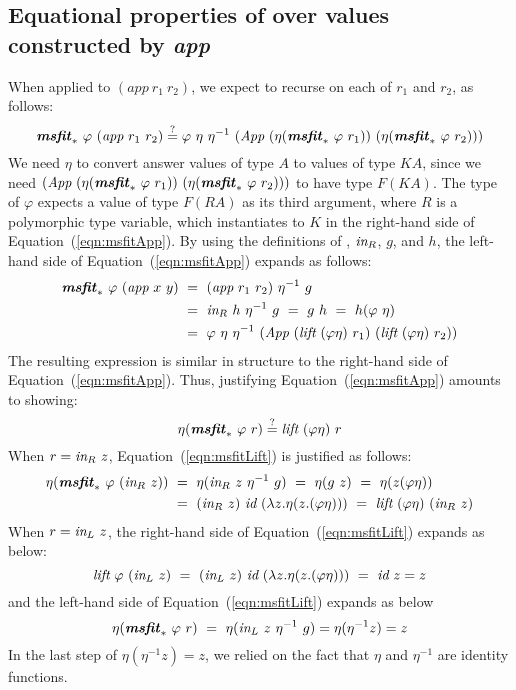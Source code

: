 \subsection{Equational properties of \msfit{*} over
	values constructed by \textit{app}}
	\label{sec:theory:eqapp}
When applied to $(\textit{app}~r_1~r_2)$, we expect \msfit{*} to
recurse on each of $r_1$ and $r_2$, as follows:\vspace*{-1ex}
\begin{equation}
\textbf{\textit{msfit}}_{*}~\varphi~(\textit{app}~r_1~r_2)
\stackrel{?}{=}
\varphi~\eta~\eta^{-1}~(\textit{App}~(\eta(\textbf{\textit{msfit}}_{*}~\varphi~r_1))
					~(\eta(\textbf{\textit{msfit}}_{*}~\varphi~r_2)))
\label{eqn:msfitApp}
\end{equation}
We need $\eta$ to convert answer values of type $A$ to values of type $KA$,
since we need $(\textit{App}~(\eta(\textbf{\textit{msfit}}_{*}~\varphi~r_1))
					~(\eta(\textbf{\textit{msfit}}_{*}~\varphi~r_2)))$
to have type $F(KA)$. The type of $\varphi$ expects a value of type $F(RA)$
as its third argument, where $R$ is a polymorphic type variable, which
instantiates to $K$ in the right-hand side of Equation~(\ref{eqn:msfitApp}).
By using the definitions of \msfit{*}, $\textit{in}_{R}$, $g$, and  $h$,
the left-hand side of Equation~(\ref{eqn:msfitApp}) expands as follows:\vspace*{-1ex}
\begin{align*}
\textbf{\textit{msfit}}_{*}~\varphi~(\textit{app}~x~y)
&~=~ (\textit{app}~r_1~r_2)~\eta^{-1}~g \\
&~=~ \textit{in}_{R}~h~\eta^{-1}~g ~=~ g~h ~=~ h(\varphi~\eta) \\
&~=~ \varphi~\eta~\eta^{-1}
     ~(\textit{App}~(\textit{lift}~(\varphi\eta)~r_1)~(\textit{lift}~(\varphi\eta)~r_2))
\end{align*}
The resulting expression is similar in structure to the right-hand side of
Equation~(\ref{eqn:msfitApp}). Thus, justifying Equation~(\ref{eqn:msfitApp})
amounts to showing:\vspace*{-1ex}
\begin{equation}
\eta(\textbf{\textit{msfit}}_{*}~\varphi~r) \stackrel{?}{=} \textit{lift}~(\varphi\eta)~r
\label{eqn:msfitLift}
\end{equation}
When $r = \textit{in}_{R}~z$, Equation~(\ref{eqn:msfitLift}) is justified as follows:\vspace*{-1ex}
\begin{align*}
\eta(\textbf{\textit{msfit}}_{*}~\varphi~(\textit{in}_{R}~z))
&~=~ \eta(\textit{in}_{R}~z~\eta^{-1}~g) ~=~ \eta(g~z) ~=~ \eta(z(\varphi\eta)) \\
&~=~ (\textit{in}_{R}~z)~\textit{id}~(\lambda z.\eta(z.(\varphi\eta)))
 ~=~ \textit{lift}~(\varphi\eta)~(\textit{in}_{R}~z)
\end{align*}
When $r = \textit{in}_{L}~z$,
the right-hand side of Equation~(\ref{eqn:msfitLift}) expands as below:\vspace*{-1ex}
\[ \textit{lift}~\varphi~(\textit{in}_{L}~z)
   ~=~ (\textit{in}_{L}~z)~\textit{id}~(\lambda z.\eta(z.(\varphi\eta)))
   ~=~ \textit{id}~z = z
\]
and the left-hand side of Equation~(\ref{eqn:msfitLift}) expands as below
\[ \eta(\textbf{\textit{msfit}}_{*}~\varphi~r) ~=~\eta(\textit{in}_{L}~z~\eta^{-1}~g) = \eta(\eta^{-1}z) = z
\]
In the last step of $\eta(\eta^{-1}z)=z$, we relied on the fact that
$\eta$ and $\eta^{-1}$ are identity functions.

